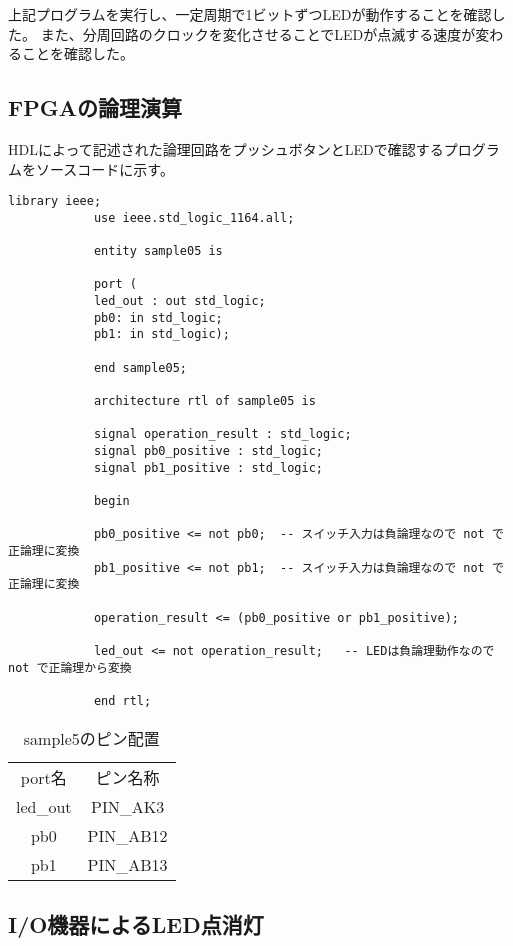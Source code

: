 \documentclass{ltjsarticle}
\begin{document}
		上記プログラムを実行し、一定周期で1ビットずつLEDが動作することを確認した。
		また、分周回路のクロックを変化させることでLEDが点滅する速度が変わることを確認した。

	\subsection{FPGAの論理演算}
		HDLによって記述された論理回路をプッシュボタンとLEDで確認するプログラムをソースコードに示す。
		\begin{lstlisting}[caption=sample5, label=code:sample5]
			library ieee;
			use ieee.std_logic_1164.all;

			entity sample05 is

			port (
			led_out : out std_logic;
			pb0: in std_logic;
			pb1: in std_logic);

			end sample05;

			architecture rtl of sample05 is

			signal operation_result : std_logic;
			signal pb0_positive : std_logic;
			signal pb1_positive : std_logic;

			begin

			pb0_positive <= not pb0;  -- スイッチ入力は負論理なので not で正論理に変換
			pb1_positive <= not pb1;  -- スイッチ入力は負論理なので not で正論理に変換

			operation_result <= (pb0_positive or pb1_positive);

			led_out <= not operation_result;   -- LEDは負論理動作なので not で正論理から変換

			end rtl;
		\end{lstlisting}

		\begin{table}[H]
		\begin{center}
		\caption{sample5のピン配置}
		\label{tab:sample5}
		\begin{tabular}{cc} \toprule
			port名&ピン名称\\
			led\_out&PIN\_AK3\\
			pb0&PIN\_AB12\\
			pb1&PIN\_AB13\\
			\bottomrule
		\end{tabular}
		\end{center}
		\end{table}

	\subsection{I/O機器によるLED点消灯}
\end{document}
